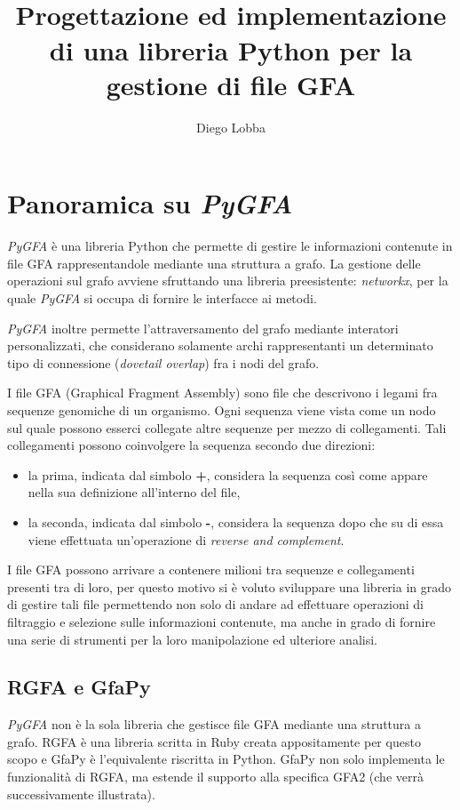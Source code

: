 \documentclass[11pt, a4paper]{book}
\title{\pygfa \\
	Progettazione ed implementazione di una libreria Python per la gestione
	di file GFA}
\author{Diego Lobba}
\newcommand {\pygfa} {\textit{PyGFA }}
\begin{document}


\tableofcontents
\listoffigures

\chapter{Panoramica su \pygfa}
\pygfa è una libreria Python che permette di gestire le informazioni
contenute in file GFA rappresentandole mediante una struttura a grafo.
La gestione delle operazioni sul grafo avviene sfruttando una libreria
preesistente: \emph{networkx}\cite{networkx}, per la quale \pygfa si occupa di fornire
le interfacce ai metodi.

\pygfa inoltre permette l'attraversamento del grafo mediante interatori
personalizzati, che considerano solamente archi rappresentanti un
determinato tipo di connessione (\emph{dovetail overlap}) fra i nodi del
grafo.

I file GFA\cite{gfa_spec} (Graphical Fragment Assembly) sono file che descrivono	
i legami fra sequenze genomiche di un organismo. Ogni sequenza
viene vista come un nodo sul quale possono esserci collegate altre
sequenze per mezzo di collegamenti. Tali collegamenti possono
coinvolgere la sequenza secondo due direzioni:
\begin{itemize}
	\item la prima, indicata dal simbolo \textbf{+}, considera la
	sequenza così come appare nella sua definizione all'interno del file,
	\item la seconda, indicata dal simbolo \textbf{-}, considera la
	sequenza dopo che su di essa viene effettuata un'operazione di
	\emph{reverse and complement}.
\end{itemize}

I file GFA possono arrivare a contenere milioni tra sequenze e collegamenti
presenti tra di loro, per questo motivo si è voluto sviluppare una libreria
in grado di gestire tali file permettendo non solo di andare ad effettuare
operazioni di filtraggio e selezione sulle informazioni contenute, ma
anche in grado di fornire una serie di strumenti per la loro
manipolazione ed ulteriore analisi.

\section{RGFA e GfaPy}
\pygfa non è la sola libreria che gestisce file GFA mediante una struttura a grafo.
RGFA è una libreria scritta in Ruby creata appositamente per questo scopo e GfaPy
è l'equivalente riscritta in Python. GfaPy non solo implementa le funzionalità di RGFA,
ma estende il supporto alla specifica GFA2 (che verrà successivamente illustrata).
\end{document}
